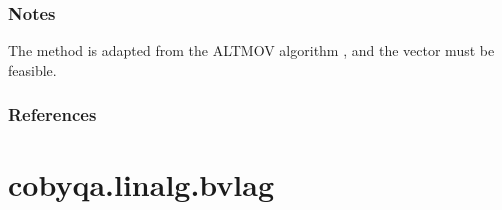 \documentclass[letterpaper,10pt,english]{sphinxmanual}
\begin{document}
\begin{fulllineitems}
\subsubsection*{Notes}

\sphinxAtStartPar
The method is adapted from the ALTMOV algorithm , and the vector
 must be feasible.
\subsubsection*{References}

\sphinxAtStartPar
{}

\end{fulllineitems}



\section{cobyqa.linalg.bvlag}
\label{\detokenize{refs/generated/cobyqa.linalg.bvlag:cobyqa-linalg-bvlag}}\label{\detokenize{refs/generated/cobyqa.linalg.bvlag::doc}}
\end{document}
